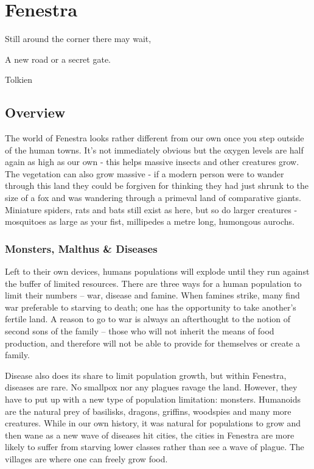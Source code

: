 \chapter{Fenestra}

\epigraph{Still around the corner there may wait,

A new road or a secret gate.}{Tolkien}

\section{Overview}

\begin{multicols}{2}

The world of Fenestra looks rather different from our own once you step outside of the human towns.
It's not immediately obvious but the oxygen levels are half again as high as our own - this helps massive insects and other creatures grow.
The vegetation can also grow massive - if a modern person were to wander through this land they could be forgiven for thinking they had just shrunk to the size of a fox and was wandering through a primeval land of comparative giants.
Miniature spiders, rats and bats still exist as here, but so do larger creatures  - mosquitoes as large as your fist, millipedes a metre long, humongous aurochs.

\subsection{Monsters, Malthus \& Diseases}

Left to their own devices, humans populations will explode until they run against the buffer of limited resources.  There are three ways for a human population to limit their numbers -- war, disease and famine.  When famines strike, many find war preferable to starving to death; one has the opportunity to take another's fertile land.  A reason to go to war is always an afterthought to the notion of second sons of the family -- those who will not inherit the means of food production, and therefore will not be able to provide for themselves or create a family.

Disease also does its share to limit population growth, but within Fenestra, diseases are rare.  No smallpox nor any plagues ravage the land.  However, they have to put up with a new type of population limitation: monsters.  Humanoids are the natural prey of basilisks, dragons, griffins, woodspies and many more creatures.  While in our own history, it was natural for populations to grow and then wane as a new wave of diseases hit cities, the cities in Fenestra are more likely to suffer from starving lower classes rather than see a wave of plague.  The villages are where one can freely grow food.


\end{multicols}
